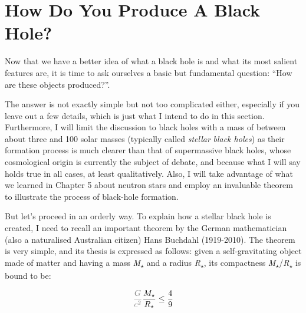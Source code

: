 \section{How Do You Produce A Black Hole?}\label{sec:06-formation}

Now that we have a better idea of what a black hole is and what its most salient
features are, it is time to ask ourselves a basic but fundamental question: ``How are
these objects produced?''.

The answer is not exactly simple but not too complicated either, especially if you leave
out a few details, which is just what I intend to do in this section. Furthermore, I
will limit the discussion to black holes with a mass of between about three and 100
solar masses (typically called \emph{stellar} \emph{black holes}) as
their formation process is much clearer than that of supermassive
black holes, whose cosmological origin is currently the subject of debate, and because
what I will say holds true in all cases, at least qualitatively. Also, I will take
advantage of what we learned in Chapter 5 about neutron stars and employ an invaluable
theorem to illustrate the process of black-hole formation.

But let's proceed in an orderly way. To explain how a stellar black hole is created, I
need to recall an important theorem by the German mathematician (also a naturalised
Australian citizen) Hans Buchdahl (1919-2010). The theorem is very
simple, and its thesis is expressed as follows: given a self-gravitating object made of
matter and having a mass \emph{M}\textsubscript{\(\star\)} and a radius
\emph{R}\textsubscript{\(\star\)}, its compactness
\emph{M}\textsubscript{\(\star\)}/\emph{R}\textsubscript{\(\star\)} is bound to be:

\begin{equation}\label{eq:06-03}
\textcolor{gray}{\frac{G}{c^{2}}}\frac{M_{\star}}{R_{\star}}\leq\frac{4}{9}
\end{equation}

